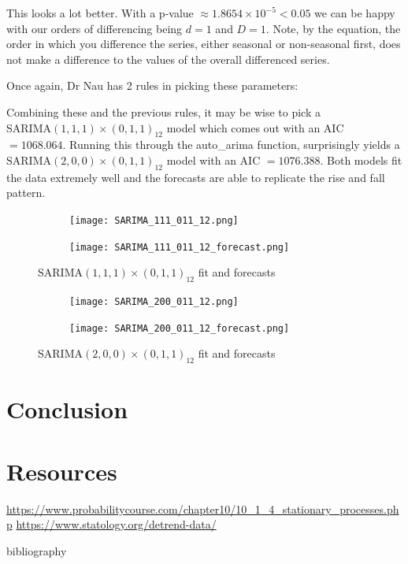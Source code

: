 \documentclass{article}
\begin{document}
  This looks a lot better. With a p-value $\approx 1.8654\times10^{-5}<0.05$ we can be happy with our orders of differencing being $d=1$ and $D=1$. Note, by the equation, the order in which you difference the series, either seasonal or non-seasonal first, does not make a difference to the values of the overall differenced series.
  
  Once again, Dr Nau has 2 rules in picking these parameters:
  \newline
  \emph{\\
  }

  Combining these and the previous rules, it may be wise to pick a\\
  SARIMA$(1,1,1)\times(0,1,1)_{12}$ model which comes out with an AIC $=1068.064$. Running this through the
  auto\_arima function, surprisingly yields a SARIMA$(2,0,0)\times(0,1,1)_{12}$ model with an AIC $=1076.388$. Both models fit the data extremely well and the forecasts are able to replicate the rise and fall pattern.

  \begin{figure}[H]
    \centering
    \captionsetup{justification=centering}
    \begin{subfigure}[b]{\linewidth}
      \texttt{[image: SARIMA\_111\_011\_12.png]}
    \end{subfigure}
    \begin{subfigure}[b]{\linewidth}
      \texttt{[image: SARIMA\_111\_011\_12\_forecast.png]}
    \end{subfigure}
    \caption{SARIMA$(1,1,1)\times(0,1,1)_{12}$ fit and forecasts}
  \end{figure}

  \begin{figure}[H]
    \centering
    \captionsetup{justification=centering}
    \begin{subfigure}[b]{\linewidth}
      \texttt{[image: SARIMA\_200\_011\_12.png]}
    \end{subfigure}
    \begin{subfigure}[b]{\linewidth}
      \texttt{[image: SARIMA\_200\_011\_12\_forecast.png]}
    \end{subfigure}
    \caption{SARIMA$(2,0,0)\times(0,1,1)_{12}$ fit and forecasts}
  \end{figure}

  \section{Conclusion}

  \section{Resources}
  \url{https://www.probabilitycourse.com/chapter10/10_1_4_stationary_processes.php}
  \url{https://www.statology.org/detrend-data/}

  bibliography\cite{articleFactCheck}
  \printbibliography
\end{document}
